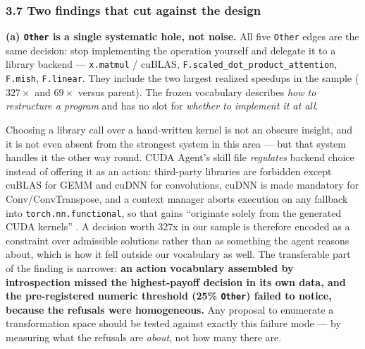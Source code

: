 \documentclass[
  11pt,
]{article}
\begin{document}
\hypertarget{two-findings-that-cut-against-the-design}{%
\subsubsection{3.7 Two findings that cut against the design}\label{two-findings-that-cut-against-the-design}}

\textbf{(a) \texttt{Other} is a single systematic hole, not noise.} All five \texttt{Other} edges are the same decision: stop implementing the operation yourself and delegate it to a library backend --- \texttt{x.matmul} / cuBLAS, \texttt{F.scaled\_dot\_product\_attention}, \texttt{F.mish}, \texttt{F.linear}. They include the two largest realized speedups in the sample (\(327\times\) and \(69\times\) versus parent). The frozen vocabulary describes \emph{how to restructure a program} and has no slot for \emph{whether to implement it at all}.

Choosing a library call over a hand-written kernel is not an obscure insight, and it is not even absent from the strongest system in this area --- but that system handles it the other way round. CUDA Agent's skill file \emph{regulates} backend choice instead of offering it as an action: third-party libraries are forbidden except cuBLAS for GEMM and cuDNN for convolutions, cuDNN is made mandatory for Conv/ConvTranspose, and a context manager aborts execution on any fallback into \texttt{torch.nn.functional}, so that gains ``originate solely from the generated CUDA kernels'' \cite[App.~ SKILL.md]{cuda1}. A decision worth 327x in our sample is therefore encoded as a constraint over admissible solutions rather than as something the agent reasons about, which is how it fell outside our vocabulary as well. The transferable part of the finding is narrower: \textbf{an action vocabulary assembled by introspection missed the highest-payoff decision in its own data, and the pre-registered numeric threshold (25\% \texttt{Other}) failed to notice, because the refusals were homogeneous.} Any proposal to enumerate a transformation space should be tested against exactly this failure mode --- by measuring what the refusals are \emph{about}, not how many there are.
\end{document}
